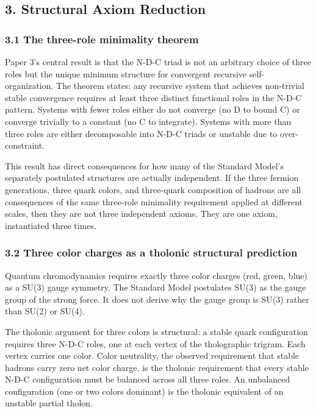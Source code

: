\documentclass[
  11pt,
  letterpaper,
]{article}
\begin{document}
\subsection{3. Structural Axiom
Reduction}\label{structural-axiom-reduction}

\subsubsection{3.1 The three-role minimality
theorem}\label{the-three-role-minimality-theorem}

Paper 3's central result is that the N-D-C triad is not an arbitrary
choice of three roles but the unique minimum structure for convergent
recursive self-organization. The theorem states: any recursive system
that achieves non-trivial stable convergence requires at least three
distinct functional roles in the N-D-C pattern. Systems with fewer roles
either do not converge (no D to bound C) or converge trivially to a
constant (no C to integrate). Systems with more than three roles are
either decomposable into N-D-C triads or unstable due to
over-constraint.

This result has direct consequences for how many of the Standard Model's
separately postulated structures are actually independent. If the three
fermion generations, three quark colors, and three-quark composition of
hadrons are all consequences of the same three-role minimality
requirement applied at different scales, then they are not three
independent axioms. They are one axiom, instantiated three times.

\subsubsection{3.2 Three color charges as a tholonic structural
prediction}\label{three-color-charges-as-a-tholonic-structural-prediction}

Quantum chromodynamics requires exactly three color charges (red, green,
blue) as a SU(3) gauge symmetry. The Standard Model postulates SU(3) as
the gauge group of the strong force. It does not derive why the gauge
group is SU(3) rather than SU(2) or SU(4).

The tholonic argument for three colors is structural: a stable quark
configuration requires three N-D-C roles, one at each vertex of the
tholographic trigram. Each vertex carries one color. Color neutrality,
the observed requirement that stable hadrons carry zero net color
charge, is the tholonic requirement that every stable N-D-C
configuration must be balanced across all three roles. An unbalanced
configuration (one or two colors dominant) is the tholonic equivalent of
an unstable partial tholon.
\end{document}
